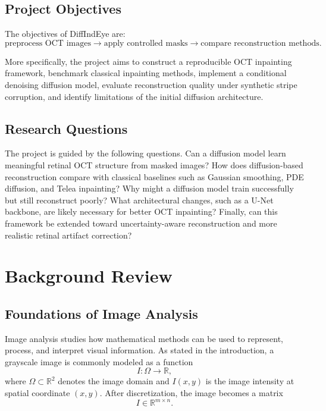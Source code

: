 \documentclass[12pt,oneside]{article}
\newcommand{\R}{\mathbb{R}}
\begin{document}
\subsection{Project Objectives}

The objectives of DiffIndEye are:
\[
\text{preprocess OCT images} \rightarrow
\text{apply controlled masks} \rightarrow
\text{compare reconstruction methods}.
\]

More specifically, the project aims to construct a reproducible OCT inpainting framework, benchmark classical inpainting methods, implement a conditional denoising diffusion model, evaluate reconstruction quality under synthetic stripe corruption, and identify limitations of the initial diffusion architecture.

\subsection*{Research Questions}

The project is guided by the following questions. Can a diffusion model learn meaningful retinal OCT structure from masked images? How does diffusion-based reconstruction compare with classical baselines such as Gaussian smoothing, PDE diffusion, and Telea inpainting? Why might a diffusion model train successfully but still reconstruct poorly? What architectural changes, such as a U-Net backbone, are likely necessary for better OCT inpainting? Finally, can this framework be extended toward uncertainty-aware reconstruction and more realistic retinal artifact correction?

\section{Background Review}

\subsection*{Foundations of Image Analysis}

Image analysis studies how mathematical methods can be used to represent, process, and interpret visual information. As stated in the introduction, a grayscale image is commonly modeled as a function
\[
I:\Omega \to \R,
\]
where $\Omega \subset \R^2$ denotes the image domain and $I(x,y)$ is the image intensity at spatial coordinate $(x,y)$. After discretization, the image becomes a matrix
\[
I \in \R^{m \times n}.
\]
\end{document}

